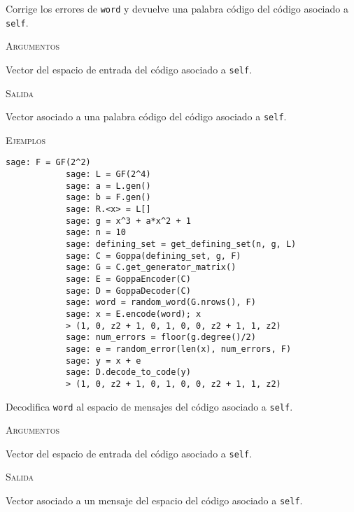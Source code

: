 \begin{description}[leftmargin=1em, font=\normalfont\ttfamily, style=nextline]
\begin{description}[font=\ttfamily, style=nextline]
        \item[decode\_to\_code(self, word)] Corrige los errores de \texttt{word} y devuelve una palabra código del código asociado a \texttt{self}.
         
        \textsc{Argumentos}
        \begin{description}[font=\normalfont\ttfamily]
            \item[word] Vector del espacio de entrada del código asociado a \texttt{self}.
        \end{description}

        \textsc{Salida}
        \begin{description}[font=\normalfont\ttfamily]
            \item[] Vector asociado a una palabra código del código asociado a \texttt{self}.
        \end{description}

        \textsc{Ejemplos}
        \begin{lstlisting}[gobble=4]
            sage: F = GF(2^2)
            sage: L = GF(2^4)
            sage: a = L.gen()
            sage: b = F.gen()
            sage: R.<x> = L[]
            sage: g = x^3 + a*x^2 + 1
            sage: n = 10
            sage: defining_set = get_defining_set(n, g, L)
            sage: C = Goppa(defining_set, g, F)
            sage: G = C.get_generator_matrix()
            sage: E = GoppaEncoder(C)
            sage: D = GoppaDecoder(C)
            sage: word = random_word(G.nrows(), F)
            sage: x = E.encode(word); x
            > (1, 0, z2 + 1, 0, 1, 0, 0, z2 + 1, 1, z2)
            sage: num_errors = floor(g.degree()/2)
            sage: e = random_error(len(x), num_errors, F)
            sage: y = x + e
            sage: D.decode_to_code(y)
            > (1, 0, z2 + 1, 0, 1, 0, 0, z2 + 1, 1, z2)
        \end{lstlisting}

        \item[decode\_to\_message(self, word)] Decodifica \texttt{word} al espacio de mensajes del código asociado a \texttt{self}.
         
        \textsc{Argumentos}
        \begin{description}[font=\normalfont\ttfamily]
            \item[word] Vector del espacio de entrada del código asociado a \texttt{self}.
        \end{description}

        \textsc{Salida}
        \begin{description}[font=\normalfont\ttfamily]
            \item[] Vector asociado a un mensaje del espacio del código asociado a \texttt{self}.
        \end{description}


\end{description}
\end{description}

